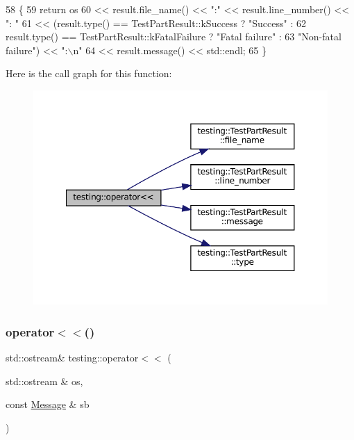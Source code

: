 \begin{DoxyCode}
58                                                                      \{
59   \textcolor{keywordflow}{return} os
60       << result.file\_name() << \textcolor{stringliteral}{":"} << result.line\_number() << \textcolor{stringliteral}{": "}
61       << (result.type() == TestPartResult::kSuccess ? \textcolor{stringliteral}{"Success"} :
62           result.type() == TestPartResult::kFatalFailure ? \textcolor{stringliteral}{"Fatal failure"} :
63           \textcolor{stringliteral}{"Non-fatal failure"}) << \textcolor{stringliteral}{":\(\backslash\)n"}
64       << result.message() << std::endl;
65 \}
\end{DoxyCode}
Here is the call graph for this function\+:
\nopagebreak
\begin{figure}[H]
\begin{center}
\leavevmode
\includegraphics[width=350pt]{namespacetesting_a7c88897836b9f492190fb2b9dfa3a327_cgraph}
\end{center}
\end{figure}
\mbox{\label{namespacetesting_a7b802e532fd68749765cb7dc156130db}} 
\subsubsection{\texorpdfstring{operator$<$$<$()}{operator<<()}\hspace{0.1cm}{\footnotesize\ttfamily [2/2]}}
{\footnotesize\ttfamily std\+::ostream\& testing\+::operator$<$$<$ (\begin{DoxyParamCaption}\item[{std\+::ostream \&}]{os,  }\item[{const \hyperlink{classtesting_1_1Message}{Message} \&}]{sb }\end{DoxyParamCaption})\hspace{0.3cm}{\ttfamily [inline]}}



